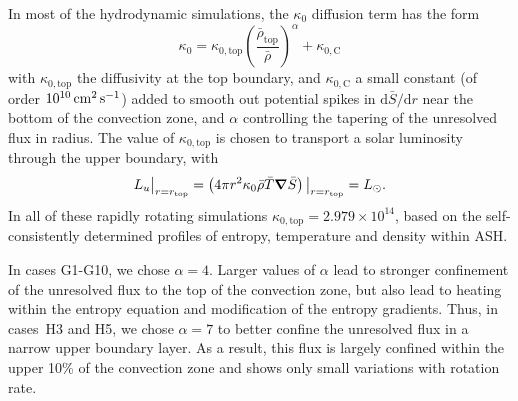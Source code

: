 In most of the hydrodynamic
simulations, the $\kappa_0$ diffusion term has the form 
\begin{equation}
  \kappa_0 = \kappa_{0,\mathrm{top}} \left(\frac{\bar{\rho}_\mathrm{top}}{\bar{\rho}}\right)^\alpha + \kappa_{0,\mathrm{C}}
\end{equation}
with $\kappa_{0,\mathrm{top}}$ the diffusivity at the top boundary,
and $\kappa_{0,\mathrm{C}}$ a small constant (of order $10^{10}\thinspace\mathrm{cm}^2\thinspace\mathrm{s}^{-1}$) added to
smooth out potential spikes in $\mathrm{d}\bar{S}/\mathrm{d}r$ near
the bottom of the convection zone, and $\alpha$ controlling the
tapering of the unresolved flux in radius.  
The value of $\kappa_{0,\mathrm{top}}$ is chosen to transport a solar luminosity
through the upper boundary, with
\begin{equation}
  L_u\big|_{r=r_\mathrm{top}} = \left(4\pi r^2 \kappa_0 \bar{\rho} \bar{T} \boldsymbol{\nabla} \bar{S}\right)\big|_{r=r_\mathrm{top}} = L_\odot.
\end{equation}
In all of these rapidly rotating simulations $\kappa_{0,\mathrm{top}} = 2.979 \times
10^{14}$, based on the self-consistently determined profiles of
entropy, temperature and density within ASH.



In cases G1-G10, we chose $\alpha=4$.  Larger values of $\alpha$ lead
to stronger confinement of the unresolved flux to the top of the
convection zone, but also lead to heating within the entropy equation
and modification of the entropy gradients.  Thus, in cases~H3 and H5,
we chose $\alpha=7$ to better confine the unresolved flux in a narrow
upper boundary layer.  As a
result, this flux is largely confined within the upper 10\% of the
convection zone and shows only small variations with rotation rate.

